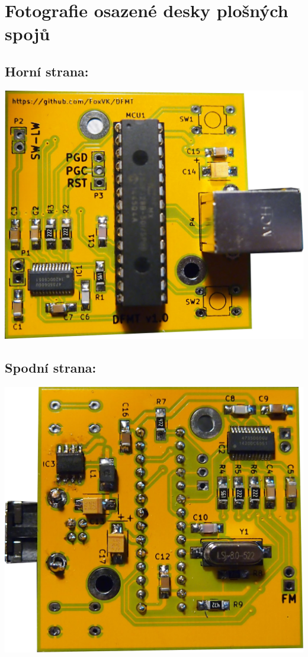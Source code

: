 \documentclass[czech,master,public,dept460,male,cpdeclaration]{diploma}	%
\begin{document}


\section{Fotografie osazené desky plošných spojů}
\label{sec:ap-pcb}

\subsection*{Horní strana:}
\begin{center}
 \includegraphics[scale=1]{figures/pcb-top.jpg}
\end{center}

\subsection*{Spodní strana:}
\begin{center} 
 \includegraphics[scale=1]{figures/pcb-bot.jpg}
\end{center}
\end{document}

